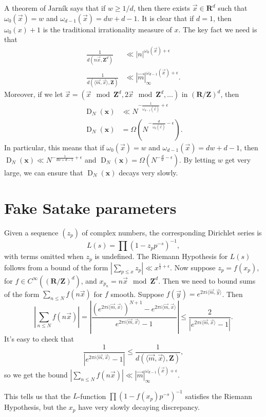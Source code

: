 \documentclass{article}
\DeclareMathOperator{\D}{D}
\newcommand{\bR}{\mathbf{R}}
\newcommand{\bx}{{\boldsymbol x}}
\newcommand{\bZ}{\mathbf{Z}}
\newcommand{\vm}{\vec{m}}
\newcommand{\vx}{\vec{x}}
\newcommand{\vy}{\vec{y}}
\begin{document}
A theorem of Jarn\'ik says that if $w\geqslant 1/d$, then there exists 
$\vx\in \bR^d$ such that $\omega_0(\vx) = w$ and 
$\omega_{d-1}(\vx) = d w + d - 1$. It is clear that if $d = 1$, then 
$\omega_0(x)+1$ is the traditional irrationality measure of $x$. The key 
fact we need is that 
\begin{align*}
	\frac{1}{d(n \vx,\bZ^d)} 
		&\ll |n|^{\omega_0(\vx) + \epsilon} \\
	\frac{1}{d(\langle \vm,\vx\rangle,\bZ)} 
		&\ll |\vm|_\infty^{\omega_{d-1}(\vx)+\epsilon} .
\end{align*}
Moreover, if we let $\vx=(\vx\mod \bZ^d,2 \vx\mod \bZ^d,\dots)$ in 
$(\bR/\bZ)^d$, then 
\begin{align*}
	\D_N(\bx) 
		&\ll N^{-\frac{1}{\omega_{d-1}(\vx)} + \epsilon} \\
	\D_N(\bx) 
		&= \Omega\left(N^{-\frac{d}{\omega_0(\vx)} - \epsilon}\right) .
\end{align*}
In particular, this means that if $\omega_0(\vx) = w$ and 
$\omega_{d-1}(\vx) = d w + d - 1$, then 
$\D_N(\bx) \ll N^{-\frac{1}{d w + d - 1} + \epsilon}$ and 
$\D_N(\bx) = \Omega(N^{-\frac{d}{w} - \epsilon})$. By letting $w$ get very 
large, we can ensure that $\D_N(\bx)$ decays very slowly. 





\section{Fake Satake parameters}

Given a sequence $(z_p)$ of complex numbers, the corresponding Dirichlet series 
is 
\[
	L(s) = \prod (1 - z_p p^{-s})^{-1} ,
\]
with terms omitted when $z_p$ is undefined. The Riemann Hypothesis for $L(s)$ 
follows from a bound of the form 
$|\sum_{p\leqslant x} z_p| \ll x^{\frac 1 2+\epsilon}$. Now suppose 
$z_p = f(x_p)$, for $f\in C^\infty((\bR/\bZ)^d)$, and 
$x_{p_n} = n \vx\mod \bZ^d$. Then we need to bound sums of the form 
$\sum_{n\leqslant N} f(n \vx)$ for $f$ smooth. Suppose 
$f(\vy) = e^{2\pi i \langle \vm,\vy\rangle}$. Then 
\[
	\left| \sum_{n\leqslant N} f(n \vx) \right| 
	= \left| \frac{\left(e^{2\pi i \langle \vm,\vx\rangle}\right)^{N+1} - e^{2\pi i \langle \vm,\vx\rangle}}{e^{2\pi i \langle \vm,\vx\rangle} - 1}\right|
	\leqslant \frac{2}{\left| e^{2\pi i \langle \vm,\vx\rangle} - 1 \right|} .
\]
It's easy to check that 
\[
	\frac{1}{\left| e^{2\pi i \langle \vm,\vx\rangle} - 1 \right|} 
		\leqslant \frac{1}{d(\langle \vm,\vx\rangle,\bZ)} ,
\]
so we get the bound 
$\left|\sum_{n\leqslant N} f(n \vx)\right| \ll |\vm|_\infty^{\omega_{d-1}(\vx)+\epsilon}$. 

This tells us that the $L$-function $\prod (1 - f(x_p) p^{-s})^{-1}$ satisfies 
the Riemann Hypothesis, but the $x_p$ have very slowly decaying discrepancy. 
\end{document}
